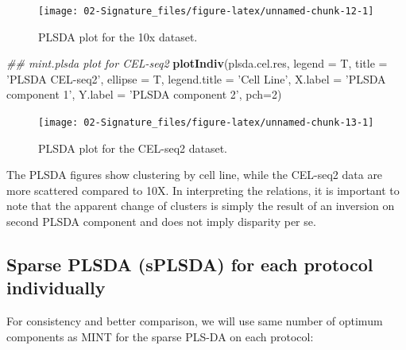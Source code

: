 \documentclass[]{book}
\newenvironment{Shaded}{\begin{snugshade}}{\end{snugshade}}
\newcommand{\CommentTok}[1]{\textcolor[rgb]{0.56,0.35,0.01}{\textit{#1}}}
\newcommand{\DataTypeTok}[1]{\textcolor[rgb]{0.13,0.29,0.53}{#1}}
\newcommand{\DecValTok}[1]{\textcolor[rgb]{0.00,0.00,0.81}{#1}}
\newcommand{\KeywordTok}[1]{\textcolor[rgb]{0.13,0.29,0.53}{\textbf{#1}}}
\newcommand{\NormalTok}[1]{#1}
\newcommand{\StringTok}[1]{\textcolor[rgb]{0.31,0.60,0.02}{#1}}
\theoremstyle{definition}
\theoremstyle{definition}
\theoremstyle{definition}
\theoremstyle{remark}
\begin{document}
\begin{figure}[ht]

{\centering \texttt{[image: 02-Signature\_files/figure-latex/unnamed-chunk-12-1]} 

}

\caption{PLSDA plot for the 10x dataset.}\label{fig:unnamed-chunk-12}
\end{figure}

\begin{Shaded}
\begin{Highlighting}[]
\CommentTok{## mint.plsda plot for CEL-seq2}
\KeywordTok{plotIndiv}\NormalTok{(plsda.cel.res,}
          \DataTypeTok{legend  =}\NormalTok{ T, }\DataTypeTok{title     =} \StringTok{'PLSDA CEL-seq2'}\NormalTok{, }
          \DataTypeTok{ellipse =}\NormalTok{ T, }\DataTypeTok{legend.title =} \StringTok{'Cell Line'}\NormalTok{,}
          \DataTypeTok{X.label =} \StringTok{'PLSDA component 1'}\NormalTok{, }
          \DataTypeTok{Y.label =} \StringTok{'PLSDA component 2'}\NormalTok{, }\DataTypeTok{pch=}\DecValTok{2}\NormalTok{)}
\end{Highlighting}
\end{Shaded}

\begin{figure}[ht]

{\centering \texttt{[image: 02-Signature\_files/figure-latex/unnamed-chunk-13-1]} 

}

\caption{PLSDA plot for the CEL-seq2 dataset.}\label{fig:unnamed-chunk-13}
\end{figure}

The PLSDA figures show clustering by cell line, while the CEL-seq2 data
are more scattered compared to 10X. In interpreting the relations, it is
important to note that the apparent change of clusters is simply the
result of an inversion on second PLSDA component and does not imply
disparity per se.

\hypertarget{sparse-plsda-splsda-for-each-protocol-individually}{%
\subsection{Sparse PLSDA (sPLSDA) for each protocol
individually}\label{sparse-plsda-splsda-for-each-protocol-individually}}

For consistency and better comparison, we will use same number of
optimum components as MINT for the sparse PLS-DA on each protocol:
\end{document}
